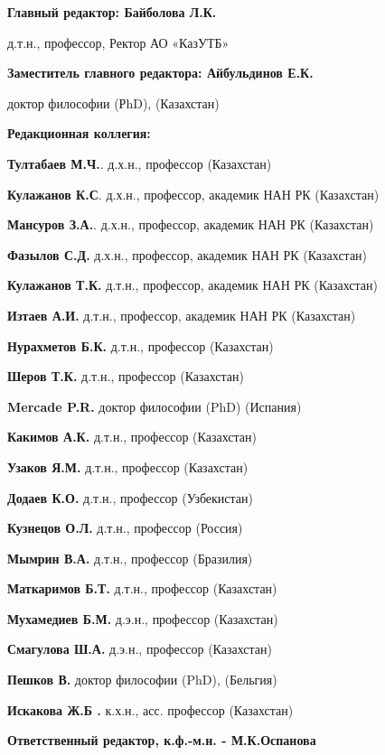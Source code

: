 \pagebreak
{\small
\begin{center}
\textbf{Главный редактор: Байболова Л.К.}

д.т.н., профессор, Ректор АО «КазУТБ»

\textbf{Заместитель главного редактора: Айбульдинов Е.К.}

доктор философии (РhD), (Казахстан)

\textbf{Редакционная коллегия:}
\end{center}

\textbf{Тултабаев М.Ч.}. д.х.н., профессор (Казахстан)

\textbf{Кулажанов К.С}. д.х.н., профессор, академик НАН РК (Казахстан)

\textbf{Мансуров З.А.}. д.х.н., профессор, академик НАН РК (Казахстан)

\textbf{Фазылов С.Д.} д.х.н., профессор, академик НАН РК (Казахстан)

\textbf{Кулажанов Т.К.} д.т.н., профессор, академик НАН РК (Казахстан)

\textbf{Изтаев А.И.} д.т.н., профессор, академик НАН РК (Казахстан)

\textbf{Нурахметов Б.К.} д.т.н., профессор (Казахстан)

\textbf{Шеров Т.К.} д.т.н., профессор (Казахстан)

\textbf{Mercade P.R.} доктор философии (PhD) (Испания)

\textbf{Какимов А.К.} д.т.н., профессор (Казахстан)

\textbf{Узаков Я.М.} д.т.н., профессор (Казахстан)

\textbf{Додаев К.О.} д.т.н., профессор (Узбекистан)

\textbf{Кузнецов О.Л.} д.т.н., профессор (Россия)

\textbf{Мымрин В.А.} д.т.н., профессор (Бразилия)

\textbf{Маткаримов Б.Т.} д.т.н., профессор (Казахстан)

\textbf{Мухамедиев Б.М.} д.э.н., профессор (Казахстан)

\textbf{Смагулова Ш.А.} д.э.н., профессор (Казахстан)

\textbf{Пешков В.} доктор философии (PhD), (Бельгия)

\textbf{Искакова Ж.Б .} к.х.н., асс. профессор (Казахстан)

\begin{center}
\textbf{Ответственный редактор, к.ф.-м.н. - М.К.Оспанова}
\end{center}

}
